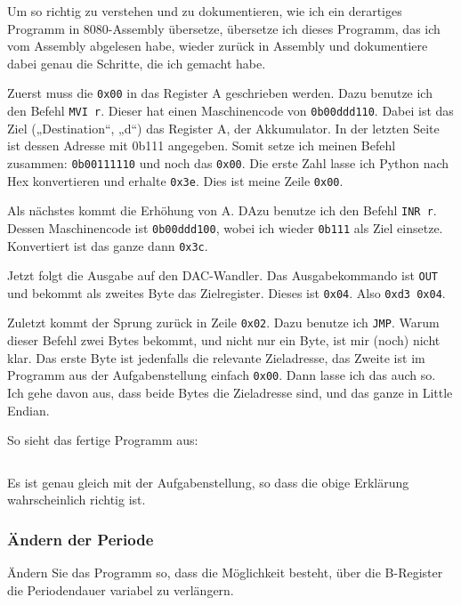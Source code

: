 Um so richtig zu verstehen und zu dokumentieren, wie ich ein derartiges
Programm in 8080-Assembly übersetze, übersetze ich dieses Programm, das ich vom
Assembly abgelesen habe, wieder zurück in Assembly und dokumentiere dabei genau
die Schritte, die ich gemacht habe.

Zuerst muss die \texttt{0x00} in das Register A geschrieben werden. Dazu
benutze ich den Befehl \texttt{MVI~r}. Dieser hat einen Maschinencode von
\texttt{0b00ddd110}. Dabei ist das Ziel („Destination“, „d“) das Register A, der
Akkumulator. In der letzten Seite ist dessen Adresse mit 0b111 angegeben. Somit
setze ich meinen Befehl zusammen: \texttt{0b00111110} und noch das \texttt{0x00}.
Die erste Zahl lasse ich Python nach Hex konvertieren und erhalte
\texttt{0x3e}. Dies ist meine Zeile \texttt{0x00}.

Als nächstes kommt die Erhöhung von A. DAzu benutze ich den Befehl
\texttt{INR~r}. Dessen Maschinencode ist \texttt{0b00ddd100}, wobei ich wieder
\texttt{0b111} als Ziel einsetze. Konvertiert ist das ganze dann \texttt{0x3c}.

Jetzt folgt die Ausgabe auf den DAC-Wandler. Das Ausgabekommando ist
\texttt{OUT} und bekommt als zweites Byte das Zielregister. Dieses ist
\texttt{0x04}. Also \texttt{0xd3~0x04}.

Zuletzt kommt der Sprung zurück in Zeile \texttt{0x02}. Dazu benutze ich
\texttt{JMP}. Warum dieser Befehl zwei Bytes bekommt, und nicht nur ein Byte,
ist mir (noch) nicht klar. Das erste Byte ist jedenfalls die relevante
Zieladresse, das Zweite ist im Programm aus der Aufgabenstellung einfach
\texttt{0x00}. Dann lasse ich das auch so. Ich gehe davon aus, dass beide Bytes
die Zieladresse sind, und das ganze in Little Endian.

So sieht das fertige Programm aus:

\inputminted[fontsize=\small, linenos]{python}{../Assembly/a.s}

Es ist genau gleich mit der Aufgabenstellung, so dass die obige Erklärung
wahrscheinlich richtig ist.

\subsubsection{Ändern der Periode}

\begin{problem}
	Ändern Sie das Programm so, dass die Möglichkeit besteht, über die
	B-Register die Periodendauer variabel zu verlängern.
\end{problem}

